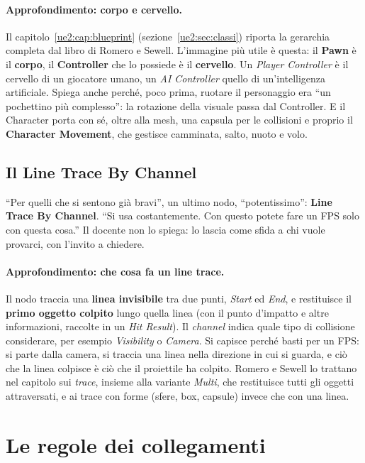 \paragraph{Approfondimento: corpo e cervello.} Il capitolo~\ref{ue2:cap:blueprint}
(sezione~\ref{ue2:sec:classi}) riporta la gerarchia completa dal libro di
Romero e Sewell. L'immagine più utile è questa: il \textbf{Pawn} è il
\textbf{corpo}, il \textbf{Controller} che lo possiede è il \textbf{cervello}.
Un \emph{Player Controller} è il cervello di un giocatore umano, un \emph{AI
Controller} quello di un'intelligenza artificiale. Spiega anche perché, poco
prima, ruotare il personaggio era ``un pochettino più complesso'': la
rotazione della visuale passa dal Controller. E il Character porta con sé,
oltre alla mesh, una capsula per le collisioni e proprio il \textbf{Character
Movement}, che gestisce camminata, salto, nuoto e volo.

\subsection{Il Line Trace By Channel}

``Per quelli che si sentono già bravi'', un ultimo nodo, ``potentissimo'':
\textbf{Line Trace By Channel}. ``Si usa costantemente. Con questo potete fare
un FPS solo con questa cosa.'' Il docente non lo spiega: lo lascia come sfida
a chi vuole provarci, con l'invito a chiedere.

\paragraph{Approfondimento: che cosa fa un line trace.} Il nodo traccia una
\textbf{linea invisibile} tra due punti, \emph{Start} ed \emph{End}, e
restituisce il \textbf{primo oggetto colpito} lungo quella linea (con il punto
d'impatto e altre informazioni, raccolte in un \emph{Hit Result}). Il
\emph{channel} indica quale tipo di collisione considerare, per esempio
\emph{Visibility} o \emph{Camera}. Si capisce perché basti per un FPS: si
parte dalla camera, si traccia una linea nella direzione in cui si guarda, e
ciò che la linea colpisce è ciò che il proiettile ha colpito. Romero e Sewell
lo trattano nel capitolo sui \emph{trace}, insieme alla variante
\emph{Multi}, che restituisce tutti gli oggetti attraversati, e ai trace con
forme (sfere, box, capsule) invece che con una linea.

\section{Le regole dei collegamenti}
\label{gd7:sec:regole}

